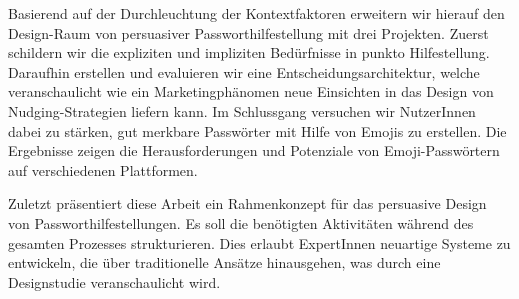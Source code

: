 Basierend auf der Durchleuchtung der Kontextfaktoren erweitern wir hierauf den Design-Raum von persuasiver Passworthilfestellung mit drei Projekten. Zuerst schildern wir die expliziten und impliziten Bedürfnisse in punkto Hilfestellung. Daraufhin erstellen und evaluieren wir eine Entscheidungsarchitektur, welche veranschaulicht wie ein Marketingphänomen neue Einsichten in das Design von Nudging-Strategien liefern kann. Im Schlussgang versuchen wir NutzerInnen dabei zu stärken, gut merkbare Passwörter mit Hilfe von Emojis zu erstellen. Die Ergebnisse zeigen die Herausforderungen und Potenziale von Emoji-Passwörtern auf verschiedenen Plattformen. 

Zuletzt präsentiert diese Arbeit ein Rahmenkonzept für das persuasive Design von Passworthilfestellungen. Es soll die benötigten Aktivitäten während des gesamten Prozesses strukturieren. Dies erlaubt ExpertInnen neuartige Systeme zu entwickeln, die über traditionelle Ansätze hinausgehen, was durch eine Designstudie veranschaulicht wird. 
